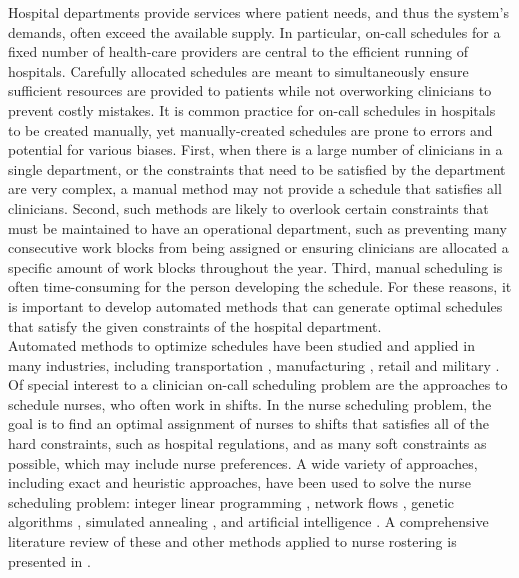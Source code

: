Hospital departments provide services where patient needs, and thus the system's
demands, often exceed the available supply. In particular, on-call schedules for
a fixed number of health-care providers are central to the efficient running of
hospitals. Carefully allocated schedules are meant to simultaneously ensure
sufficient resources are provided to patients while not overworking clinicians
to prevent costly mistakes. It is common practice for on-call schedules in
hospitals to be created manually, yet manually-created schedules are prone to
errors and potential for various biases. First, when there is a large number of
clinicians in a single department, or the constraints that need to be satisfied
by the department are very complex, a manual method may not provide a schedule
that satisfies all clinicians. Second, such methods are likely to overlook
certain constraints that must be maintained to have an operational department,
such as preventing many consecutive work blocks from being assigned or ensuring
clinicians are allocated a specific amount of work blocks throughout the year.
Third, manual scheduling is often time-consuming for the person developing the
schedule. For these reasons, it is important to develop automated methods that
can generate optimal schedules that satisfy the given constraints of the
hospital department. \\

Automated methods to optimize schedules have been studied and applied in many
industries, including transportation \cite{aickelin_improved_2006,
	goel_truck_2012, gunther_combined_2010}, manufacturing
\cite{al-yakoob_mixed-integer_2007, al-yakoob_column_2008,
	alfares_simulation_2007}, retail \cite{chapados_retail_2011,
	nissen_automatic_2010} and military \cite{horn_scheduling_2007,
	laguna_modeling_2005}. Of special interest to a clinician on-call scheduling
problem are the approaches to schedule nurses, who often work in shifts. In the
nurse scheduling problem, the goal is to find an optimal assignment of nurses to
shifts that satisfies all of the hard constraints, such as hospital regulations,
and as many soft constraints as possible, which may include nurse preferences. A
wide variety of approaches, including exact and heuristic approaches, have been
used to solve the nurse scheduling problem: integer linear programming
\cite{azaiez_0-1_2005, trilling_nurse_2006, widyastiti_nurses_2016}, network
flows \cite{el_adoly_new_2018}, genetic algorithms
\cite{aickelin_exploiting_2000, jan_evolutionary_2000, kawanaka_genetic_2001},
simulated annealing \cite{jaszkiewicz_metaheuristic_1997}, and artificial
intelligence \cite{abdennadher_nurse_nodate, li_hybrid_2003}. A comprehensive
literature review of these and other methods applied to nurse rostering is
presented in \cite{burke_state_2004}. \\

